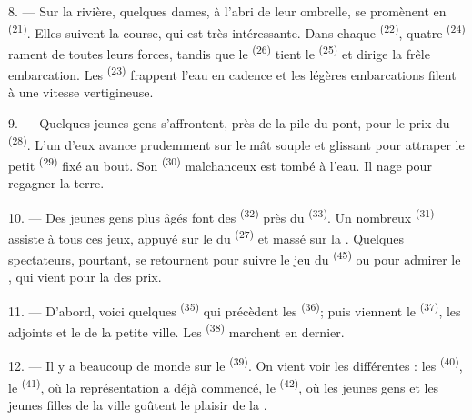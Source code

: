 \VUsaut{4.4mm}
\VUsaut{3.4mm}

8. --- Sur la rivière, quelques dames, à l'abri de leur ombrelle, se promènent
en  \textsuperscript{(21)}. Elles suivent la course, qui est très
intéressante. Dans chaque  \textsuperscript{(22)}, quatre
 \textsuperscript{(24)} rament de toutes leurs forces, tandis
que le  \textsuperscript{(26)} tient le 
\textsuperscript{(25)} et dirige la frêle embarcation. Les 
\textsuperscript{(23)} frappent l'eau en cadence et les légères embarcations
filent à une vitesse vertigineuse.

9. --- Quelques jeunes gens s'affrontent, près de la pile du pont, pour le prix
du  \textsuperscript{(28)}. L'un d'eux avance
prudemment sur le mât souple et glissant pour attraper le petit
 \textsuperscript{(29)} fixé au bout. Son
 \textsuperscript{(30)} malchanceux est tombé à l'eau. Il
nage pour regagner la terre.

10. --- Des jeunes gens plus âgés font des 
\textsuperscript{(32)} près du  \textsuperscript{(33)}. Un
nombreux  \textsuperscript{(31)} assiste à tous ces jeux, appuyé
sur le  du  \textsuperscript{(27)} et massé sur la
. Quelques spectateurs, pourtant, se retournent pour suivre le jeu
du  \textsuperscript{(45)} ou pour admirer le
, qui vient pour la  des prix.

11. --- D'abord, voici quelques  \textsuperscript{(35)} qui
précèdent les  \textsuperscript{(36)}; puis viennent le
 \textsuperscript{(37)}, les adjoints et le  de la petite ville. Les  \textsuperscript{(38)}
marchent en dernier.

\VUsaut{5.0mm}
\VUsaut{3.6mm}

12. --- Il y a beaucoup de monde sur le 
\textsuperscript{(39)}. On vient voir les différentes  : les
 \textsuperscript{(40)}, le 
\textsuperscript{(41)}, où la représentation a déjà commencé, le  \textsuperscript{(42)}, où les jeunes gens et les jeunes filles de la
ville goûtent le plaisir de la .


